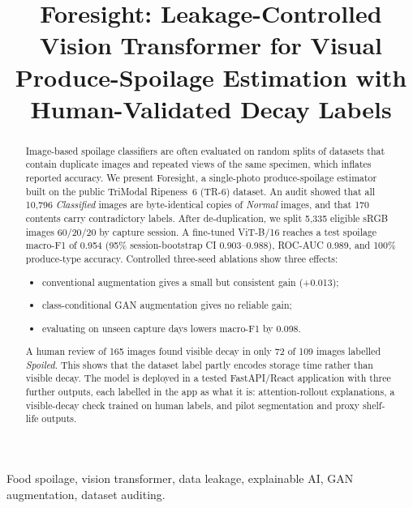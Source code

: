 \documentclass[conference]{IEEEtran}
\begin{document}
\title{Foresight: Leakage-Controlled Vision Transformer for Visual Produce-Spoilage Estimation with Human-Validated Decay Labels}

\author{
}

\maketitle

\begin{abstract}
Image-based spoilage classifiers are often evaluated on random splits of datasets that contain duplicate images and repeated views of the same specimen, which inflates reported accuracy.
We present Foresight, a single-photo produce-spoilage estimator built on the public TriModal Ripeness~6 (TR-6) dataset.
An audit showed that all 10,796 \emph{Classified} images are byte-identical copies of \emph{Normal} images, and that 170 contents carry contradictory labels.
After de-duplication, we split 5,335 eligible sRGB images 60/20/20 by capture session.
A fine-tuned ViT-B/16 reaches a test spoilage macro-F1 of 0.954 (95\% session-bootstrap CI 0.903--0.988), ROC-AUC 0.989, and 100\% produce-type accuracy.
Controlled three-seed ablations show three effects:
\begin{itemize}
\item conventional augmentation gives a small but consistent gain (+0.013);
\item class-conditional GAN augmentation gives no reliable gain;
\item evaluating on unseen capture days lowers macro-F1 by 0.098.
\end{itemize}
A human review of 165 images found visible decay in only 72 of 109 images labelled \emph{Spoiled}. This shows that the dataset label partly encodes storage time rather than visible decay.
The model is deployed in a tested FastAPI/React application with three further outputs, each labelled in the app as what it is: attention-rollout explanations, a visible-decay check trained on human labels, and pilot segmentation and proxy shelf-life outputs.
\end{abstract}

\begin{IEEEkeywords}
Food spoilage, vision transformer, data leakage, explainable AI, GAN augmentation, dataset auditing.
\end{IEEEkeywords}
\end{document}
